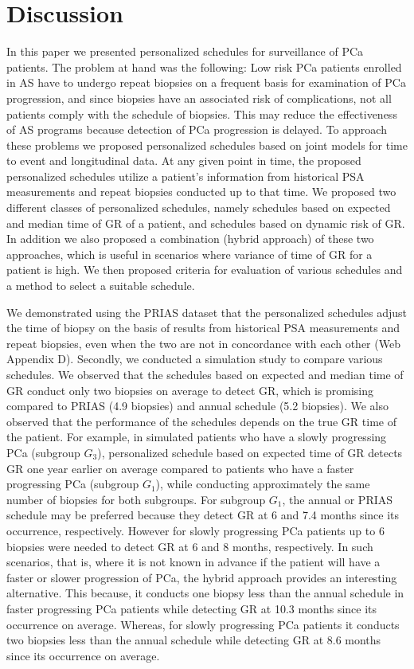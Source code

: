 
\section{Discussion}
\label{sec: discussion}
In this paper we presented personalized schedules for surveillance of PCa patients. The problem at hand was the following: Low risk PCa patients enrolled in AS have to undergo repeat biopsies on a frequent basis for examination of PCa progression, and since biopsies have an associated risk of complications, not all patients comply with the schedule of biopsies. This may reduce the effectiveness of AS programs because detection of PCa progression is delayed. To approach these problems we proposed personalized schedules based on joint models for time to event and longitudinal data. At any given point in time, the proposed personalized schedules utilize a patient's information from historical PSA measurements and repeat biopsies conducted up to that time. We proposed two different classes of personalized schedules, namely schedules based on expected and median time of GR of a patient, and schedules based on dynamic risk of GR. In addition we also proposed a combination (hybrid approach) of these two approaches, which is useful in scenarios where variance of time of GR for a patient is high. We then proposed criteria for evaluation of various schedules and a method to select a suitable schedule.

We demonstrated using the PRIAS dataset that the personalized schedules adjust the time of biopsy on the basis of results from historical PSA measurements and repeat biopsies, even when the two are not in concordance with each other (Web Appendix D). Secondly, we conducted a simulation study to compare various schedules. We observed that the schedules based on expected and median time of GR conduct only two biopsies on average to detect GR, which is promising compared to PRIAS (4.9 biopsies) and annual schedule (5.2 biopsies). We also observed that the performance of the schedules depends on the true GR time of the patient. For example, in simulated patients who have a slowly progressing PCa (subgroup $G_3$), personalized schedule based on expected time of GR detects GR one year earlier on average compared to patients who have a faster progressing PCa (subgroup $G_1$), while conducting approximately the same number of biopsies for both subgroups. For subgroup $G_1$, the annual or PRIAS schedule may be preferred because they detect GR at 6 and 7.4 months since its occurrence, respectively. However for slowly progressing PCa patients up to 6 biopsies were needed to detect GR at 6 and 8 months, respectively. In such scenarios, that is, where it is not known in advance if the patient will have a faster or slower progression of PCa, the hybrid approach provides an interesting alternative. This because, it conducts one biopsy less than the annual schedule in faster progressing PCa patients while detecting GR at 10.3 months since its occurrence on average. Whereas, for slowly progressing PCa patients it conducts two biopsies less than the annual schedule while detecting GR at 8.6 months since its occurrence on average.

